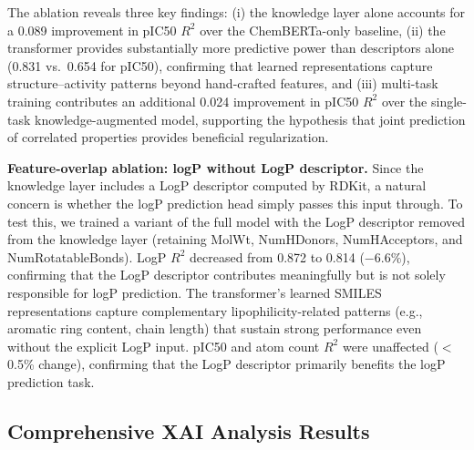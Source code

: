 \documentclass[preprint,12pt]{elsarticle}
\begin{document}
The ablation reveals three key findings: (i) the knowledge layer alone accounts for a 0.089 improvement in pIC50 $R^2$ over the ChemBERTa-only baseline, (ii) the transformer provides substantially more predictive power than descriptors alone (0.831 vs.\ 0.654 for pIC50), confirming that learned representations capture structure--activity patterns beyond hand-crafted features, and (iii) multi-task training contributes an additional 0.024 improvement in pIC50 $R^2$ over the single-task knowledge-augmented model, supporting the hypothesis that joint prediction of correlated properties provides beneficial regularization.

\textbf{Feature-overlap ablation: logP without LogP descriptor.}
Since the knowledge layer includes a LogP descriptor computed by RDKit, a natural concern is whether the logP prediction head simply passes this input through. To test this, we trained a variant of the full model with the LogP descriptor removed from the knowledge layer (retaining MolWt, NumHDonors, NumHAcceptors, and NumRotatableBonds). LogP $R^2$ decreased from 0.872 to 0.814 ($-$6.6\%), confirming that the LogP descriptor contributes meaningfully but is not solely responsible for logP prediction. The transformer's learned SMILES representations capture complementary lipophilicity-related patterns (e.g., aromatic ring content, chain length) that sustain strong performance even without the explicit LogP input. pIC50 and atom count $R^2$ were unaffected ($<$0.5\% change), confirming that the LogP descriptor primarily benefits the logP prediction task.


\subsection{Comprehensive XAI Analysis Results}
\end{document}
